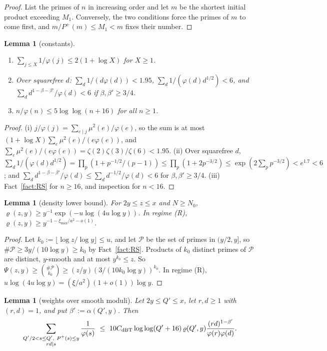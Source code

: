 \documentclass[11pt]{amsart}
\newtheorem{lemma}[theorem]{Lemma}
\theoremstyle{definition}
\newcommand{\cP}{\mathcal{P}}
\newcommand{\Pp}{P^{+}}
\begin{document}
\begin{proof}
List the primes of $n$ in increasing order and let $m$ be the shortest initial product exceeding $M_1$. Conversely, the two conditions
force the primes of $m$ to come first, and $m/\Pp(m)\le M_1<m$ fixes their number.
\end{proof}

\begin{lemma}[constants]\label{lem:E56}
\begin{enumerate}[label=(\roman*)]
\item $\sum_{j\le X}1/\varphi(j)\le2(1+\log X)$ for $X\ge1$.
\item Over squarefree $d$: $\sum_d1/(d\varphi(d))<1.95$, $\sum_d1/(\varphi(d)d^{1/2})<6$, and $\sum_dd^{1-\beta-\beta'}/\varphi(d)<6$ if $\beta,\beta'\ge3/4$.
\item $n/\varphi(n)\le5\log\log(n+16)$ for all $n\ge1$.
\end{enumerate}
\end{lemma}

\begin{proof}
(i) $j/\varphi(j)=\sum_{e\mid j}\mu^2(e)/\varphi(e)$, so the sum is at most $(1+\log X)\sum_e\mu^2(e)/(e\varphi(e))$, and
$\sum_e\mu^2(e)/(e\varphi(e))=\zeta(2)\zeta(3)/\zeta(6)<1.95$. (ii) Over squarefree $d$, $\sum_d1/(\varphi(d)d^{1/2})=\prod_p(1+p^{-1/2}/(p-1))\le\prod_p(1+2p^{-3/2})\le\exp(2\sum_pp^{-3/2})<e^{1.7}<6$; and
$\sum_dd^{1-\beta-\beta'}/\varphi(d)\le\sum_dd^{-1/2}/\varphi(d)<6$ for $\beta,\beta'\ge3/4$. (iii) Fact~\ref{fact:RS} for $n\ge16$, and inspection for $n<16$.
\end{proof}

\begin{lemma}[density lower bound]\label{lem:E7}
For $2y\le z\le x$ and $N\ge N_0$, $\varrho(z,y)\ge y^{-1}\exp(-u\log(4u\log y))$. In regime (R), $\varrho(z,y)\ge y^{-1-\xi_{\max}/a^2-o(1)}$.
\end{lemma}

\begin{proof}
Let $k_0:=\lfloor\log z/\log y\rfloor\le u$, and let $\cP$ be the set of primes in $(y/2,y]$, so $\#\cP\ge3y/(10\log y)\ge k_0$ by Fact~\ref{fact:RS}. Products
of $k_0$ distinct primes of $\cP$ are distinct, $y$-smooth and at most $y^{k_0}\le z$. So
$\Psi(z,y)\ge\binom{\#\cP}{k_0}\ge(z/y)(3/(10k_0\log y))^{k_0}$. In regime (R), $u\log(4u\log y)=(\xi/a^2)(1+o(1))\log y$.
\end{proof}

\begin{lemma}[weights over smooth moduli]\label{lem:E8}
Let $2y\le Q'\le x$, let $r,d\ge1$ with $(r,d)=1$, and put $\beta':=\alpha(Q',y)$. Then
\[
\sum_{\substack{Q'/2<s\le Q',\ \Pp(s)\le y\\ rd\mid s}}\frac1{\varphi(s)}\ \le\ 10C_{\rm dBT}\log\log(Q'+16)\,\varrho(Q',y)\frac{(rd)^{1-\beta'}}{\varphi(r)\varphi(d)}.
\]
\end{lemma}
\end{document}
